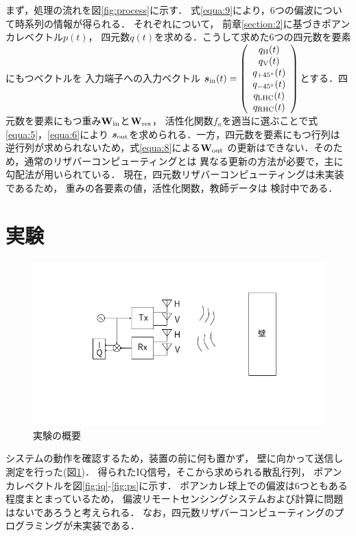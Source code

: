 \documentclass[uplatex,a4paper,10pt]{jsarticle}
\begin{document}
まず，処理の流れを図\ref{fig:process}に示す．
式\ref{equa:9}により，6つの偏波について時系列の情報が得られる．
それぞれについて，
前章\ref{section:2}に基づきポアンカレベクトル$p(t)$，
四元数$q(t)$を求める．こうして求めた6つの四元数を要素にもつベクトルを
入力端子への入力ベクトル
$\bm{s}_{\rm{in}}(t) = 
\left(
    \begin{array}{c}
        q_{\rm{H}}(t)\\
        q_{\rm{V}}(t)\\
        q_{+45^\circ}(t)\\
        q_{-45^\circ}(t)\\
        q_{\rm{LHC}}(t)\\
        q_{\rm{RHC}}(t)
    \end{array}
\right)$とする．四元数を要素にもつ重み$\bf{W_{\rm{in}}}$と$\bf{W_{\rm{res}}}$，
活性化関数$f_a$を適当に選ぶことで式\ref{equa:5}，\ref{equa:6}により
$\bm{s}_{\rm{out}}$を求められる．一方，四元数を要素にもつ行列は
逆行列が求められないため，式\ref{equa:8}による$\bf{W_{\rm{out}}}$
の更新はできない．そのため，通常のリザバーコンピューティングとは
異なる更新の方法が必要で，主に勾配法が用いられている\cite{quaternion1}\cite{quaternion2}．
現在，四元数リザバーコンピューティングは未実装であるため，
重みの各要素の値，活性化関数，教師データは
検討中である．


\section{実験}
\begin{figure}[hbtp]
	\centering
	\includegraphics[scale=0.4]{../img/exp.png}
    \caption{実験の概要}
	\label{fig:exp}
\end{figure}
システムの動作を確認するため，装置の前に何も置かず，
壁に向かって送信し測定を行った(図\ref{fig:exp})．
得られたIQ信号，そこから求められる散乱行列，
ポアンカレベクトルを図\ref{fig:iq}-\ref{fig:ps}に示す．
ポアンカレ球上での偏波は6つともある程度まとまっているため，
偏波リモートセンシングシステムおよび計算に問題はないであろうと考えられる．
なお，四元数リザバーコンピューティングのプログラミングが未実装である．
\end{document}
